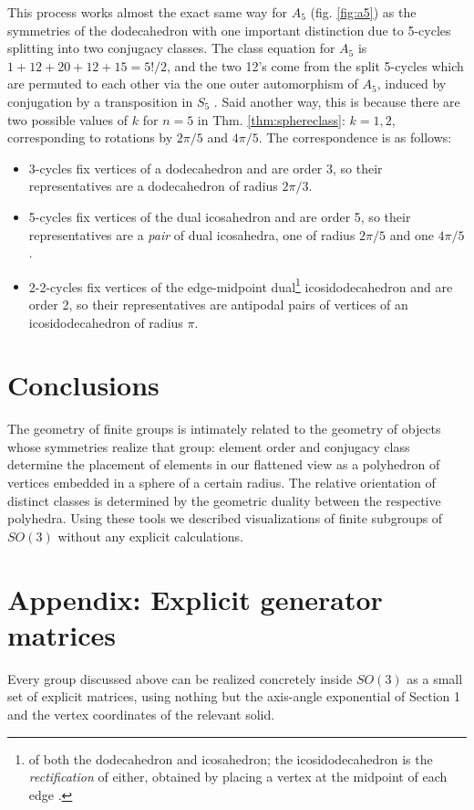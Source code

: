 \documentclass{amsart}
\theoremstyle{plain}
\theoremstyle{definition}
\begin{document}
This process works almost the exact same way for $A_5$ (fig. \ref{fig:a5}) as the symmetries of the dodecahedron with one important distinction due to 5-cycles splitting into two conjugacy classes. The class equation for $A_5$ is $1+12+20+12+15 = 5!/2$, and the two 12's come from the split 5-cycles which are permuted to each other via the one outer automorphism of $A_5$, induced by conjugation by a transposition in $S_5$ \cite{dummitfoote}. Said another way, this is because there are two possible values of $k$ for $n=5$ in Thm. \ref{thm:sphereclass}: $k=1,2$, corresponding to rotations by $2\pi/5$ and $4\pi/5$. The correspondence is as follows:
\begin{itemize}
    \item 3-cycles fix vertices of a dodecahedron and are order 3, so their representatives are a dodecahedron of radius $2\pi/3$.
    \item 5-cycles fix vertices of the dual icosahedron and are order 5, so their representatives are a \emph{pair} of dual icosahedra, one of radius $2\pi/5$ and one $4\pi/5$.
    \item 2-2-cycles fix vertices of the edge-midpoint dual\footnote{of both the dodecahedron and icosahedron; the icosidodecahedron is the \emph{rectification} of either, obtained by placing a vertex at the midpoint of each edge \cite{coxeter1973}.} icosidodecahedron and are order 2, so their representatives are antipodal pairs of vertices of an icosidodecahedron of radius $\pi$.
\end{itemize}

\section{Conclusions}
The geometry of finite groups is intimately related to the geometry of objects whose symmetries realize that group: element order and conjugacy class determine the placement of elements in our flattened view as a polyhedron of vertices embedded in a sphere of a certain radius. The relative orientation of distinct classes is determined by the geometric duality between the respective polyhedra. Using these tools we described visualizations of finite subgroups of $SO(3)$ without any explicit calculations.

\section*{Appendix: Explicit generator matrices}

Every group discussed above can be realized concretely inside $SO(3)$ as a small set of explicit matrices, using nothing but the axis-angle exponential of Section 1 and the vertex coordinates of the relevant solid.
\end{document}
